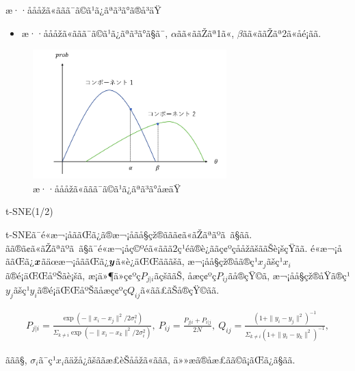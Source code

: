 \documentclass[dvipdfmx]{beamer} %
\newcommand{\bm}[1]{\mbox{\boldmath $#1$}}
\begin{document}
\begin{frame}{æ··åååžã«ããã¯ã©ã¹ã¿ãªã³ã°ã®å³äŸ}

\begin{itemize}
	\item æ··åååžã«ããã¯ã©ã¹ã¿ãªã³ã°ã§ã¯, $\alpha$ãã«ããŽãª1ã«, $\beta$ãã«ããŽãª2ã«åé¡ãã.
\end{itemize}

\begin{figure}[tbp]
\begin{center}
\includegraphics[clip,height= 50mm]{data/mix_cluster.png}
\end{center}
\caption{æ··åååžã«ããã¯ã©ã¹ã¿ãªã³ã°åæäŸ}
\label{mix_cluster}
\end{figure}

\end{frame}

\begin{frame}{t-SNE(1/2)}

t-SNEã¯é«æ¬¡åããŒã¿ã®æ¬¡åãå§çž®ããã¢ã«ãŽãªãºã ã§ãã. ãã®ã¢ã«ãŽãªãºã ã§ã¯é«æ¬¡åç©ºéã«ããã$2$ç¹éã®è¿ããç¢ºçååžãšããŠè¡šçŸãã. é«æ¬¡åããŒã¿$\bm x$ãäœæ¬¡åããŒã¿$\bm y$ã«è¿äŒŒãããšã, æ¬¡åå§çž®åã®ç¹$x_j$ãšç¹$x_i$ã®é¡äŒŒåºŠãè¡šã, æ¡ä»¶ä»ç¢ºç$P_{j|i}$ãçšããŠ, åæç¢ºç$P_{ij}$ãå®çŸ©ã, æ¬¡åå§çž®åŸã®ç¹$y_j$ãšç¹$y_i$ã®é¡äŒŒåºŠãåæç¢ºç$Q_{ij}$ã«ãã£ãŠå®çŸ©ãã.

\footnotesize
\begin{eqnarray*}
\label{tsne1}
P_{j|i} = \frac{\exp(-\|x_i - x_j\|^2 / 2\sigma_i^2)}{\Sigma_{k \neq i}\exp(-\|x_i - x_k\|^2/ 2\sigma_i^2)},\ 
P_{ij} = \frac{P_{j|i} + P_{i|j}}{2N},\ 
Q_{ij} = \frac{(1 + \|y_i - y_j\|^2)^{-1}}{\Sigma_{k \neq i}(1 + \|y_i - y_k\|^2)^{-1}},
\end{eqnarray*}
\normalsize

\noindent
ããã§, $\sigma_i$ã¯ç¹$x_i$ãäž­å¿ãšããæ­£èŠååžã«ããã, ä»»æã®åæ£ãã©ã¡ãŒã¿ã§ãã.
\end{frame}
\end{document}
